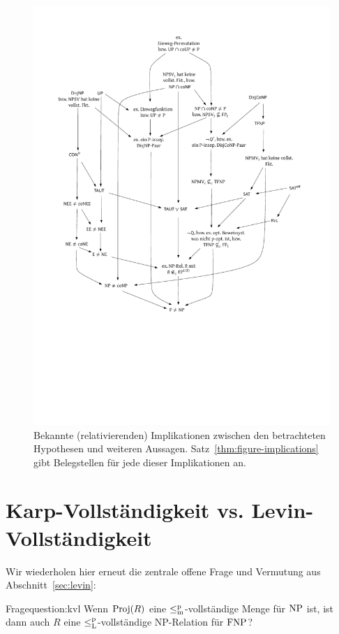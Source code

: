 \begin{figure}
    \includegraphics[page=1]{figures.pdf}
    \caption{Bekannte (relativierenden) Implikationen zwischen den betrachteten Hypothesen und weiteren Aussagen. Satz~\ref{thm:figure-implications} gibt Belegstellen für jede dieser Implikationen an.}\label{fig:figure-implications}
    \forcerectofloat
\end{figure}

\section{Karp-Vollständigkeit vs. Levin-Vollständigkeit}\label{sec:karp-vs-levin}

Wir wiederholen hier erneut die zentrale offene Frage und Vermutung aus Abschnitt~\ref{sec:levin}:

\begin{reptheorem}{Frage}{question:kvl}
Wenn $\operatorname{Proj}(R)$ eine $\leq_\mathrm{m}^\mathrm{p}$-vollständige Menge für $\mathrm{NP}$ ist, ist dann auch $R$ eine $\leq_\mathrm{L}^\mathrm{p}$-vollständige NP-Relation für $\mathrm{FNP}$?
\end{reptheorem}

